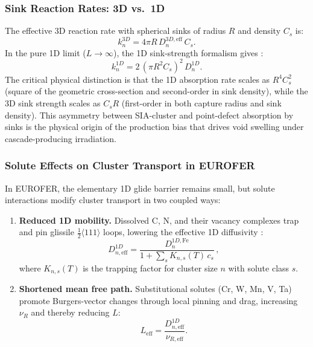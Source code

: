 \documentclass[pdflatex,sn-basic]{sn-jnl} %
\begin{document}
\subsubsection{Sink Reaction Rates: 3D vs.\ 1D}

The effective 3D reaction rate with spherical sinks of radius $R$ and density $C_s$ is:
\begin{equation}\label{eq:reaction_3D}
    k_n^{3D} = 4\pi R \, D_n^{3D,\mathrm{eff}} \, C_s.
\end{equation}
In the pure 1D limit ($L \to \infty$), the 1D sink-strength formalism gives \citep{Trinkaus2002, Golubov2001}:
\begin{equation}\label{eq:reaction_1D}
    k_n^{1D} = 2\,(\pi R^2 C_s)^2 \, D_n^{1D}.
\end{equation}
The critical physical distinction is that the 1D absorption rate scales as $R^4C_s^2$ (square of the geometric cross-section and second-order in sink density), while the 3D sink strength scales as $C_sR$ (first-order in both capture radius and sink density). This asymmetry between SIA-cluster and point-defect absorption by sinks is the physical origin of the production bias that drives void swelling under cascade-producing irradiation.

\subsubsection{Solute Effects on Cluster Transport in EUROFER}

In EUROFER, the elementary 1D glide barrier remains small, but solute interactions modify cluster transport in two coupled ways:

\begin{enumerate}
\item \textbf{Reduced 1D mobility.} Dissolved C, N, and their vacancy complexes trap and pin glissile $\frac{1}{2}\langle111\rangle$ loops, lowering the effective 1D diffusivity \citep{Terentyev2011_loop, Anento2013}:
\begin{equation}\label{eq:D1D_eff_Eurofer}
    D_{n,\mathrm{eff}}^{1D} = \frac{D_n^{1D,\mathrm{Fe}}}{1 + \displaystyle\sum_s K_{n,s}(T)\,c_s}\,,
\end{equation}
where $K_{n,s}(T)$ is the trapping factor for cluster size $n$ with solute class $s$.

\item \textbf{Shortened mean free path.} Substitutional solutes (Cr, W, Mn, V, Ta) promote Burgers-vector changes through local pinning and drag, increasing $\nu_R$ and thereby reducing $L$:
\begin{equation}\label{eq:L_eff}
    L_{\mathrm{eff}} = \frac{D_{n,\mathrm{eff}}^{1D}}{\nu_{R,\mathrm{eff}}}.
\end{equation}
\end{enumerate}
\end{document}
